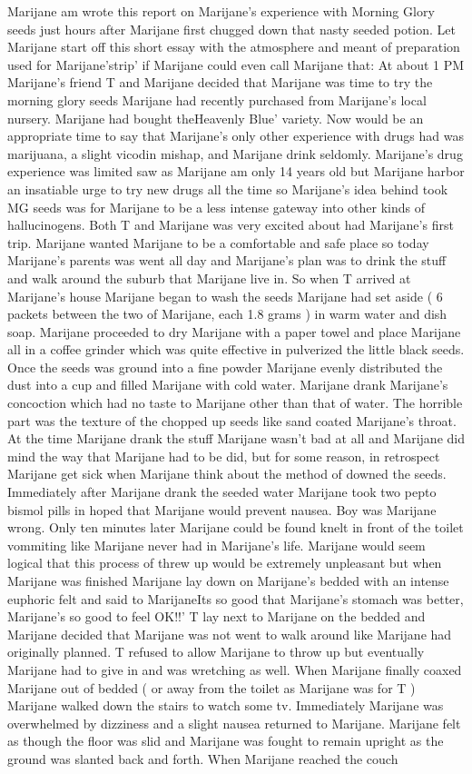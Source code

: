 \documentclass[12pt]{book}
\begin{document}
Marijane am wrote this report on Marijane's experience with Morning Glory seeds just hours after Marijane first chugged down that nasty seeded potion. Let Marijane start off this short essay with the atmosphere and meant of preparation used for Marijane'strip' if Marijane could even call Marijane that: At about 1 PM Marijane's friend T and Marijane decided that Marijane was time to try the morning glory seeds Marijane had recently purchased from Marijane's local nursery. Marijane had bought theHeavenly Blue' variety. Now would be an appropriate time to say that Marijane's only other experience with drugs had was marijuana, a slight vicodin mishap, and Marijane drink seldomly. Marijane's drug experience was limited saw as Marijane am only 14 years old but Marijane harbor an insatiable urge to try new drugs all the time so Marijane's idea behind took MG seeds was for Marijane to be a less intense gateway into other kinds of hallucinogens. Both T and Marijane was very excited about had Marijane's first trip. Marijane wanted Marijane to be a comfortable and safe place so today Marijane's parents was went all day and Marijane's plan was to drink the stuff and walk around the suburb that Marijane live in. So when T arrived at Marijane's house Marijane began to wash the seeds Marijane had set aside ( 6 packets between the two of Marijane, each 1.8 grams ) in warm water and dish soap. Marijane proceeded to dry Marijane with a paper towel and place Marijane all in a coffee grinder which was quite effective in pulverized the little black seeds. Once the seeds was ground into a fine powder Marijane evenly distributed the dust into a cup and filled Marijane with cold water. Marijane drank Marijane's concoction which had no taste to Marijane other than that of water. The horrible part was the texture of the chopped up seeds like sand coated Marijane's throat. At the time Marijane drank the stuff Marijane wasn't bad at all and Marijane did mind the way that Marijane had to be did, but for some reason, in retrospect Marijane get sick when Marijane think about the method of downed the seeds. Immediately after Marijane drank the seeded water Marijane took two pepto bismol pills in hoped that Marijane would prevent nausea. Boy was Marijane wrong. Only ten minutes later Marijane could be found knelt in front of the toilet vommiting like Marijane never had in Marijane's life. Marijane would seem logical that this process of threw up would be extremely unpleasant but when Marijane was finished Marijane lay down on Marijane's bedded with an intense euphoric felt and said to MarijaneIts so good that Marijane's stomach was better, Marijane's so good to feel OK!!' T lay next to Marijane on the bedded and Marijane decided that Marijane was not went to walk around like Marijane had originally planned. T refused to allow Marijane to throw up but eventually Marijane had to give in and was wretching as well. When Marijane finally coaxed Marijane out of bedded ( or away from the toilet as Marijane was for T ) Marijane walked down the stairs to watch some tv. Immediately Marijane was overwhelmed by dizziness and a slight nausea returned to Marijane. Marijane felt as though the floor was slid and Marijane was fought to remain upright as the ground was slanted back and forth. When Marijane reached the couch 
\end{document}
